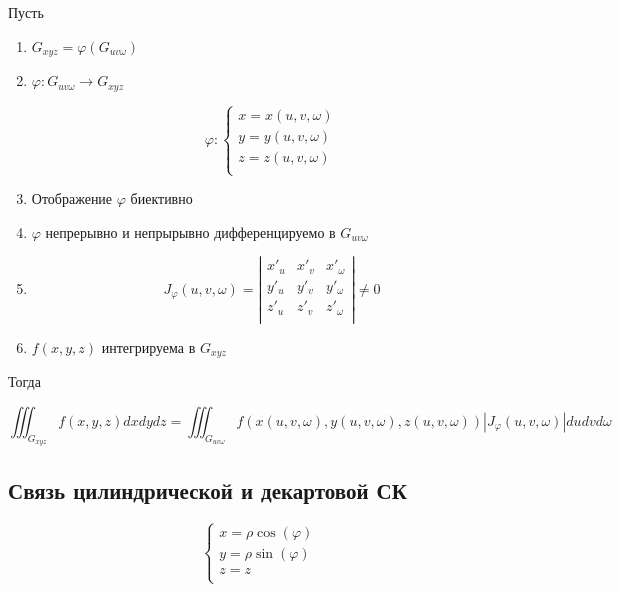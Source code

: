 \documentclass[a4paper, 14pt]{report}
\begin{document}
    \begin{theorem}
        Пусть

        \begin{enumerate}
            \item $G_{xyz} = \varphi(G_{uv\omega})$
            \item $\varphi: G_{uv\omega} \to G_{xyz}$

                $$
                \varphi : 
                \begin{cases}
                    x = x(u, v, \omega) \\
                    y = y(u, v, \omega) \\
                    z = z(u, v, \omega) \\
                \end{cases}
                $$

            \item Отображение $\varphi$ биективно
            \item $\varphi$ непрерывно и непрырывно дифференцируемо в $G_{uv\omega}$
            \item 
                $$
                J_\varphi(u,v,\omega) = \left|
                \begin{matrix}
                    x'_u & x'_v & x'_\omega \\
                    y'_u & y'_v & y'_\omega \\
                    z'_u & z'_v & z'_\omega \\
                \end{matrix}
                \right| \ne 0
                $$
            \item $f(x,y,z)$ интегрируема в $G_{xyz}$
        \end{enumerate}

        Тогда

        $$
        \iiint_{G_{xyz}} f(x,y,z)dxdydz = \iiint_{G_{uv\omega}} f(x(u,v,\omega), y(u,v,\omega), z(u,v,\omega)) |J_\varphi(u,v,\omega)| dudvd\omega
        $$
    \end{theorem}

    \subsection{Связь цилиндрической и декартовой СК}

    $$
    \begin{cases}
        x = \rho \cos(\varphi) \\
        y = \rho \sin(\varphi) \\
        z = z \\
    \end{cases}
    $$
\end{document}
